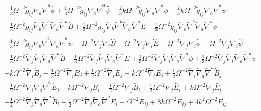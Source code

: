\documentclass[10pt,letterpaper]{article}
\numberwithin{equation}{section}
\begin{document}
\begin{appendices}
\begin{eqnarray}
&& + \tfrac{1}{3} \Omega^{-2} \tilde{g}_{ij} \tilde{\nabla}_{a}\tilde{\nabla}^{a}\overset{..}{\phi} + \tfrac{1}{3} \Omega^{-2} \tilde{g}_{ij} \tilde{\nabla}_{a}\tilde{\nabla}^{a}\overset{..}{\psi} -  \tfrac{2}{3} k \Omega^{-2} \tilde{g}_{ij} \tilde{\nabla}_{a}\tilde{\nabla}^{a}\phi -  \tfrac{2}{3} k \Omega^{-2} \tilde{g}_{ij} \tilde{\nabla}_{a}\tilde{\nabla}^{a}\psi \nonumber \\ 
&& -  \tfrac{1}{3} \Omega^{-2} \tilde{g}_{ij} \tilde{\nabla}_{b}\tilde{\nabla}^{b}\tilde{\nabla}_{a}\tilde{\nabla}^{a}\dot{B} + \tfrac{1}{3} \Omega^{-2} \tilde{g}_{ij} \tilde{\nabla}_{b}\tilde{\nabla}^{b}\tilde{\nabla}_{a}\tilde{\nabla}^{a}\overset{..}{E} -  \tfrac{1}{3} \Omega^{-2} \tilde{g}_{ij} \tilde{\nabla}_{b}\tilde{\nabla}^{b}\tilde{\nabla}_{a}\tilde{\nabla}^{a}\phi \nonumber \\ 
&& -  \tfrac{1}{3} \Omega^{-2} \tilde{g}_{ij} \tilde{\nabla}_{b}\tilde{\nabla}^{b}\tilde{\nabla}_{a}\tilde{\nabla}^{a}\psi -  \Omega^{-2} \tilde{\nabla}_{j}\tilde{\nabla}_{i}\overset{...}{B} + \Omega^{-2} \tilde{\nabla}_{j}\tilde{\nabla}_{i}\overset{....}{E} -  \Omega^{-2} \tilde{\nabla}_{j}\tilde{\nabla}_{i}\overset{..}{\phi} -  \Omega^{-2} \tilde{\nabla}_{j}\tilde{\nabla}_{i}\overset{..}{\psi} \nonumber \\ 
&& + \tfrac{1}{3} \Omega^{-2} \tilde{\nabla}_{j}\tilde{\nabla}_{i}\tilde{\nabla}_{a}\tilde{\nabla}^{a}\dot{B} -  \tfrac{1}{3} \Omega^{-2} \tilde{\nabla}_{j}\tilde{\nabla}_{i}\tilde{\nabla}_{a}\tilde{\nabla}^{a}\overset{..}{E} + \tfrac{1}{3} \Omega^{-2} \tilde{\nabla}_{j}\tilde{\nabla}_{i}\tilde{\nabla}_{a}\tilde{\nabla}^{a}\phi + \tfrac{1}{3} \Omega^{-2} \tilde{\nabla}_{j}\tilde{\nabla}_{i}\tilde{\nabla}_{a}\tilde{\nabla}^{a}\psi \nonumber \\ 
&& - k \Omega^{-2} \tilde{\nabla}_{i}\dot{B}_{j} -  \tfrac{1}{2} \Omega^{-2} \tilde{\nabla}_{i}\overset{...}{B}_{j} + \tfrac{1}{2} \Omega^{-2} \tilde{\nabla}_{i}\overset{....}{E}_{j} + k \Omega^{-2} \tilde{\nabla}_{i}\overset{..}{E}_{j} + \tfrac{1}{2} \Omega^{-2} \tilde{\nabla}_{i}\tilde{\nabla}_{a}\tilde{\nabla}^{a}\dot{B}_{j} \nonumber \\ 
&& -  \tfrac{1}{2} \Omega^{-2} \tilde{\nabla}_{i}\tilde{\nabla}_{a}\tilde{\nabla}^{a}\overset{..}{E}_{j} -  k \Omega^{-2} \tilde{\nabla}_{j}\dot{B}_{i} -  \tfrac{1}{2} \Omega^{-2} \tilde{\nabla}_{j}\overset{...}{B}_{i} + \tfrac{1}{2} \Omega^{-2} \tilde{\nabla}_{j}\overset{....}{E}_{i} + k \Omega^{-2} \tilde{\nabla}_{j}\overset{..}{E}_{i} \nonumber \\ 
&& + \tfrac{1}{2} \Omega^{-2} \tilde{\nabla}_{j}\tilde{\nabla}_{a}\tilde{\nabla}^{a}\dot{B}_{i} -  \tfrac{1}{2} \Omega^{-2} \tilde{\nabla}_{j}\tilde{\nabla}_{a}\tilde{\nabla}^{a}\overset{..}{E}_{i}+\Omega^{-2} \overset{....}{E}_{ij} + 8 k \Omega^{-2} \overset{..}{E}_{ij} + 4 k^2 \Omega^{-2} E_{ij} \nonumber \\ 

\end{eqnarray}
\end{appendices}
\end{document}
